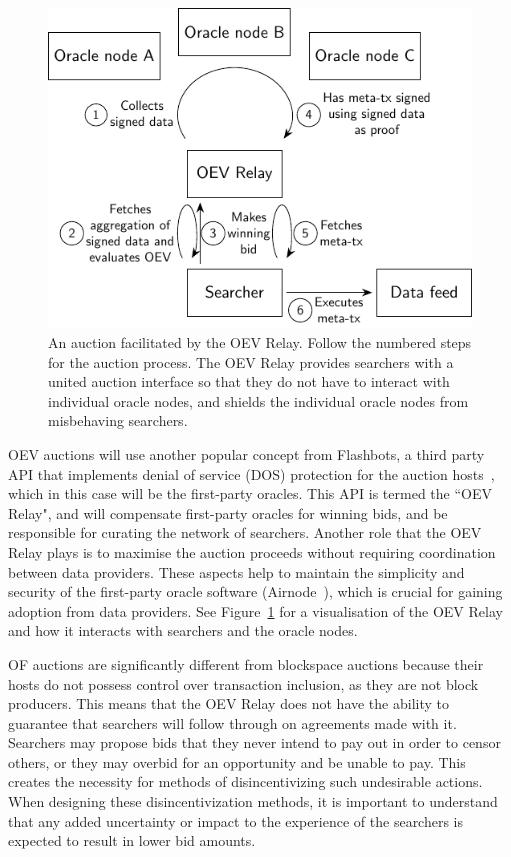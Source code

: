 \documentclass[11pt]{article}
\begin{document}
\begin{figure}
	\centering
	\includegraphics{fig/oev-relay/oev-relay}
	\caption{An auction facilitated by the OEV Relay.
		Follow the numbered steps for the auction process.
		The OEV Relay provides searchers with a united auction interface so that they do not have to interact with individual oracle nodes, and shields the individual oracle nodes from misbehaving searchers.}
	\label{fig:oev-relay}
\end{figure}

OEV auctions will use another popular concept from Flashbots, a third party API that implements denial of service (DOS) protection for the auction hosts~\cite{flashbots-boost-relays}, which in this case will be the first-party oracles.
This API is termed the ``OEV Relay", and will compensate first-party oracles for winning bids, and be responsible for curating the network of searchers.
Another role that the OEV Relay plays is to maximise the auction proceeds without requiring coordination between data providers.
These aspects help to maintain the simplicity and security of the first-party oracle software (Airnode~\cite{airnode}), which is crucial for gaining adoption from data providers.
See Figure~\ref{fig:oev-relay} for a visualisation of the OEV Relay and how it interacts with searchers and the oracle nodes.

OF auctions are significantly different from blockspace auctions because their hosts do not possess control over transaction inclusion, as they are not block producers.
This means that the OEV Relay does not have the ability to guarantee that searchers will follow through on agreements made with it.
Searchers may propose bids that they never intend to pay out in order to censor others, or they may overbid for an opportunity and be unable to pay.
This creates the necessity for methods of disincentivizing such undesirable actions.
When designing these disincentivization methods, it is important to understand that any added uncertainty or impact to the experience of the searchers is expected to result in lower bid amounts.
\end{document}
